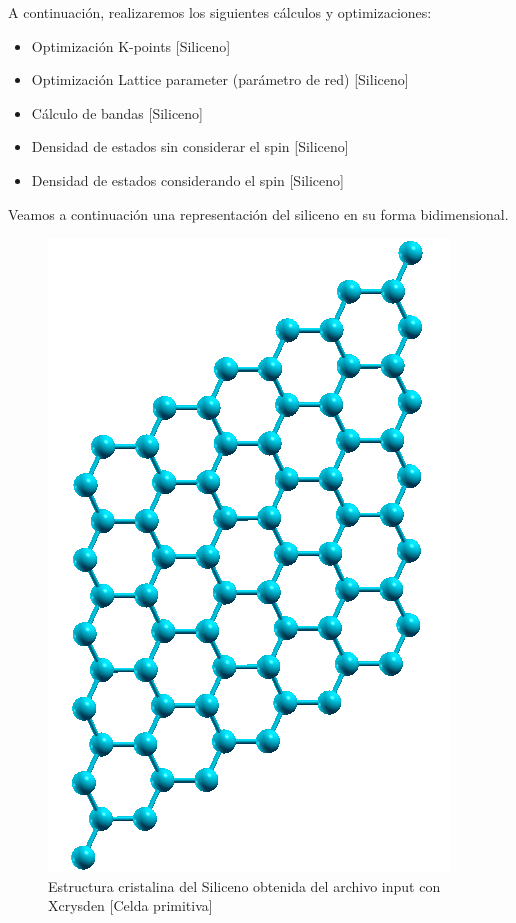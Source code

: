 A continuación, realizaremos los siguientes cálculos y optimizaciones:

\begin{itemize}
    \item Optimización K-points [Siliceno]
    \item Optimización Lattice parameter (parámetro de red) [Siliceno]
    \item Cálculo de bandas [Siliceno]
    \item Densidad de estados sin considerar el spin [Siliceno] 
    \item Densidad de estados considerando el spin [Siliceno]
\end{itemize}

\vspace{0.5cm}

Veamos a continuación una representación del siliceno en su forma bidimensional.

\begin{figure}[H]
    \centering
    \includegraphics[scale=0.5]{images_siliceno/siliceno_2d.png}
    \caption{Estructura cristalina del Siliceno obtenida del archivo input con Xcrysden [Celda primitiva]}
\end{figure}

